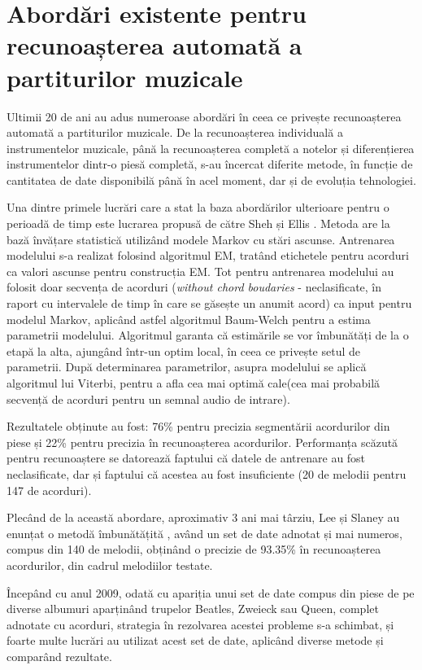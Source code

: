 \documentclass[a4paper,12pt]{report}
\begin{document}
\chapter{Abordări existente pentru recunoașterea automată a partiturilor muzicale}
Ultimii 20 de ani au adus numeroase abordări în ceea ce privește recunoașterea automată
a partiturilor muzicale. De la recunoașterea individuală a instrumentelor muzicale, până
la recunoașterea completă a notelor și diferențierea instrumentelor dintr-o piesă 
completă, s-au încercat diferite metode, în funcție de cantitatea de date disponibilă
până în acel moment, dar și de evoluția tehnologiei.

Una dintre primele lucrări care a stat la baza abordărilor ulterioare pentru o perioadă
de timp este lucrarea propusă de către Sheh și Ellis \cite{Chord-Segmentation-and-Recognition-using-EM-Trained-HMM}.
Metoda are la bază învățare statistică utilizând modele Markov cu stări ascunse. 
Antrenarea modelului s-a realizat folosind algoritmul EM, tratând etichetele pentru
acorduri ca valori ascunse pentru construcția EM. Tot pentru antrenarea modelului
au folosit doar secvența de acorduri (\emph{without chord boudaries} - neclasificate, în
raport cu intervalele de timp în care se găsește un anumit acord) ca
input pentru modelul Markov, aplicând astfel algoritmul Baum-Welch pentru a estima parametrii
modelului. Algoritmul garanta că estimările se vor îmbunătăți de la o etapă la alta, ajungând
într-un optim local, în ceea ce privește setul de parametrii. 
După determinarea parametrilor,
asupra modelului se aplică algoritmul lui Viterbi, pentru a afla cea mai optimă cale(cea
mai probabilă secvență de acorduri pentru un semnal audio de intrare).

Rezultatele obținute au fost: 76\% pentru precizia segmentării acordurilor din
piese și 22\% pentru precizia în recunoașterea acordurilor. Performanța scăzută pentru
recunoaștere se datorează faptului că datele de antrenare au fost neclasificate, dar și 
faptului că acestea au fost insuficiente (20 de melodii pentru 147 de acorduri).

Plecând de la această abordare, aproximativ 3 ani mai târziu, Lee și Slaney au enunțat
o metodă îmbunătățită \cite{Automatic-Chord-Recognition-from-Audio-Using-an-HMM-with-Supervised-Learning}, 
având un set de date adnotat și mai numeros, compus din 140 de melodii,
obținând o precizie de 93.35\% în recunoașterea acordurilor, din cadrul melodiilor
testate.

Începând cu anul 2009, odată cu apariția unui 
set de date compus din piese de pe diverse albumuri aparținând trupelor Beatles, Zweieck 
sau Queen, complet adnotate cu acorduri, strategia în rezolvarea acestei probleme s-a schimbat,
și foarte multe lucrări au utilizat acest set de date, aplicând diverse metode și comparând rezultate.
\end{document}
